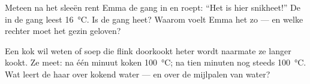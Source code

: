 \begin{exercise}[$\star\star$]\label{exo:g3:temperature-thermometers:10}
Meteen na het sleeën rent Emma de gang in en roept: ``Het is hier
snikheet!'' De  in de gang leest \qty{16}{\celsius}. Is de
gang heet? Waarom voelt Emma het zo --- en welke rechter moet het
gezin geloven?
\end{exercise}

\begin{exercise}[$\star\star$]\label{exo:g3:temperature-thermometers:11}
Een kok wil weten of soep die flink doorkookt heter wordt naarmate ze
langer kookt. Ze meet: na één minuut koken \qty{100}{\celsius}; na
tien minuten nog steeds \qty{100}{\celsius}. Wat leert de
 haar over kokend water --- en over de mijlpalen van
water?
\end{exercise}

